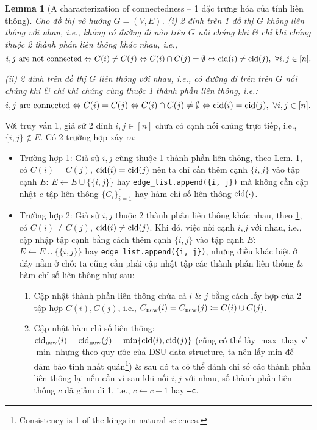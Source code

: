 \documentclass{article}
\newtheorem{lemma}{Lemma}
\begin{document}
\begin{lemma}[A characterization of connectedness -- 1 đặc trưng hóa của tính liên thông]
    \label{lem: characterization connectedness}
    Cho đồ thị vô hướng $G = (V,E)$.
    (i) 2 đỉnh trên 1 đồ thị $G$ không liên thông với nhau, i.e., không có đường đi nào trên $G$ nối chúng khi \& chỉ khi chúng thuộc 2 thành phần liên thông khác nhau, i.e.,
    \begin{equation*}
        i,j\mbox{ are not connected}\Leftrightarrow C(i)\ne C(j)\Leftrightarrow C(i)\cap C(j) = \emptyset\Leftrightarrow{\rm cid}(i)\ne{\rm cid}(j),\ \forall i,j\in[n].
    \end{equation*}
    \item(ii) 2 đỉnh trên đồ thị $G$ liên thông với nhau, i.e., có đường đi trên trên $G$ nối chúng khi \& chỉ khi chúng cùng thuộc 1 thành phần liên thông, i.e.:
    \begin{equation*}
        i,j\mbox{ are connected}\Leftrightarrow C(i) = C(j)\Leftrightarrow C(i)\cap C(j)\ne\emptyset\Leftrightarrow{\rm cid}(i) = {\rm cid}(j),\ \forall i,j\in[n].
    \end{equation*}
\end{lemma}
Với truy vấn 1, giả sử 2 đỉnh $i,j\in[n]$ chưa có cạnh nối chúng trực tiếp, i.e., $\{i,j\}\notin E$. Có 2 trường hợp xảy ra:
\begin{itemize}
    \item Trường hợp 1: Giả sử $i,j$ cùng thuộc 1 thành phần liên thông, theo Lem. \ref{lem: characterization connectedness}, có $C(i) = C(j)$, ${\rm cid}(i) = {\rm cid}(j)$ nên ta chỉ cần thêm cạnh $\{i,j\}$ vào tập cạnh $E$: $E\leftarrow E\cup\{\{i,j\}\}$ hay \verb|edge_list.append({i, j})| mà không cần cập nhật $c$ tập liên thông $\{C_i\}_{i=1}^c$ hay hàm chỉ số liên thông ${\rm cid}(\cdot)$.
    \item Trường hợp 2: Giả sử $i,j$ thuộc 2 thành phần liên thông khác nhau, theo \ref{lem: characterization connectedness}, có $C(i)\ne C(j)$, ${\rm cid}(i)\ne {\rm cid}(j)$. Khi đó, việc nối cạnh $i,j$ với nhau, i.e., cập nhập tập cạnh bằng cách thêm cạnh $\{i,j\}$ vào tập cạnh $E$: $E\leftarrow E\cup\{\{i,j\}\}$ hay \verb|edge_list.append({i, j})|, nhưng điều khác biệt ở đây nằm ở chỗ: ta cũng cần phải cập nhật tập các thành phần liên thông \& hàm chỉ số liên thông như sau:
    \begin{enumerate}
        \item Cập nhật thành phần liên thông chứa cả $i$ \& $j$ bằng cách lấy hợp của 2 tập hợp $C(i),C(j)$, i.e., $C_{\rm new}(i) = C_{\rm new}(j)\coloneqq C(i)\cup C(j)$.
        \item Cập nhật hàm chỉ số liên thông: ${\rm cid}_{\rm new}(i) = {\rm cid}_{\rm new}(j) = \min\{{\rm cid}(i),{\rm cid}(j)\}$ (cũng có thể lấy $\max$ thay vì $\min$ nhưng theo quy ước của DSU data structure, ta nên lấy min để đảm bảo tính nhất quán\footnote{Consistency is 1 of the kings in natural sciences.}) \& sau đó ta có thể đánh chỉ số các thành phần liên thông lại nếu cần vì sau khi nối $i,j$ với nhau, số thành phần liên thông $c$ đã giảm đi 1, i.e., $c\leftarrow c - 1$ hay {\tt--c}.
    \end{enumerate}
\end{itemize}
\end{document}
